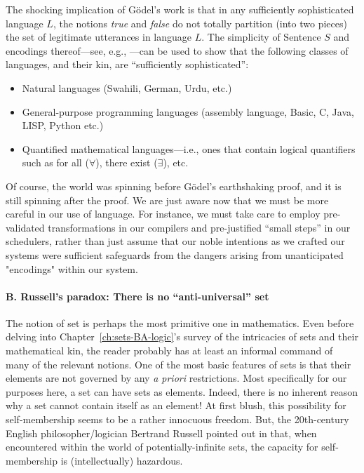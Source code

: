 The shocking implication of G\"{o}del's work is that in any
sufficiently sophisticated language $L$, the notions {\it true} and
{\it false} do not totally partition (into two pieces) the set of
legitimate utterances in language $L$.  The simplicity of Sentence $S$
and encodings thereof---see, e.g., \cite{Rosenberg09}---can be used to
show that the following classes of languages, and their kin, are
``sufficiently sophisticated'':
\begin{itemize}
\item
Natural languages (Swahili, German, Urdu, etc.)
\item
General-purpose programming languages (assembly language, Basic, C,
Java, LISP, Python etc.)
\item
Quantified mathematical languages---i.e., ones that contain logical
quantifiers such as {\sc for all} ($\forall$), {\sc there exist}
($\exists$), etc.
\end{itemize}

Of course, the world was spinning before G\"{o}del's earthshaking proof,
and it is still spinning after the proof.  We are just aware now that
we must be more careful in our use of language.  For instance, we must take care to
employ pre-validated transformations in our compilers and
pre-justified ``small steps'' in our schedulers, rather than just assume that our noble intentions
as we crafted our systems were sufficient safeguards from the dangers arising from unanticipated "encodings"
within our system.


\paragraph{\small\sf B.  Russell's paradox: There is no ``anti-universal'' set}

The notion of set is perhaps the most primitive one in mathematics.
Even before delving into Chapter~\ref{ch:sets-BA-logic}'s survey of
the intricacies of sets and their mathematical kin, the reader
probably has at least an informal command of many of the relevant
notions.  One of the most basic features of sets is that their
elements are not governed by any {\it a priori} restrictions.  Most
specifically for our purposes here, a set can have sets as elements.
Indeed, there is no inherent reason why a set cannot contain itself as
an element!  At first blush, this possibility for self-membership
seems to be a rather innocuous freedom.  But, the 20th-century English
philosopher/logician Bertrand Russell
pointed out in \cite{Russell02,Russell03} that, when encountered
within the world of potentially-infinite sets, the capacity for
self-membership is (intellectually) hazardous.

